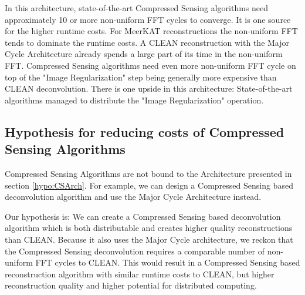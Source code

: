 In this architecture, state-of-the-art Compressed Sensing algorithms need approximately 10 or more non-uniform FFT cycles to converge. It is one source for the higher runtime costs. For MeerKAT reconstructions the non-uniform FFT tends to dominate the runtime costs. A CLEAN reconstruction with the Major Cycle Architecture already spends a large part of its time in the non-uniform FFT. Compressed Sensing algorithms need even more non-uniform FFT cycle on top of the "Image Regularization" step being generally more expensive than CLEAN deconvolution. There is one upside in this architecture: State-of-the-art algorithms managed to distribute the "Image Regularization" operation.

\subsection{Hypothesis for reducing costs of Compressed Sensing Algorithms}
Compressed Sensing Algorithms are not bound to the Architecture presented in section \ref{hypo:CSArch}. For example, we can design a Compressed Sensing based deconvolution algorithm and use the Major Cycle Architecture instead. 

Our hypothesis is: We can create a Compressed Sensing based deconvolution algorithm which is both distributable and creates higher quality reconstructions than CLEAN. Because it also uses the Major Cycle architecture, we reckon that the Compressed Sensing deconvolution requires a comparable number of non-uniform FFT cycles to CLEAN. This would result in a Compressed Sensing based reconstruction algorithm with similar runtime costs to CLEAN, but higher reconstruction quality and higher potential for distributed computing.


